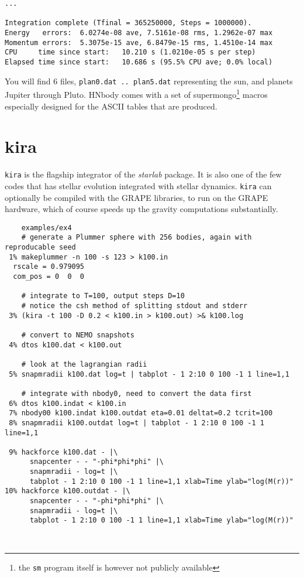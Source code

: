 {\begin{verbatim}
...
 
Integration complete (Tfinal = 365250000, Steps = 1000000).
Energy   errors:  6.0274e-08 ave, 7.5161e-08 rms, 1.2962e-07 max
Momentum errors:  5.3075e-15 ave, 6.8479e-15 rms, 1.4510e-14 max
CPU     time since start:   10.210 s (1.0210e-05 s per step)
Elapsed time since start:   10.686 s (95.5% CPU ave; 0.0% local)

\end{verbatim}\normalsize

You will find 6 files, {\tt plan0.dat .. plan5.dat} representing
the sun, and planets Jupiter through Pluto. HNbody comes with a
set of supermongo\footnote{the {\tt sm} program itself 
is however not publicly
available} macros especially  designed for the
ASCII tables that are produced.

\section{kira}

{\tt kira} is the flagship integrator of the {\it starlab} package. It is also
one of the few codes that has stellar evolution integrated with stellar
dynamics. {\tt kira} can optionally be compiled with the GRAPE libraries,
to run on the GRAPE hardware, which of course speeds up the gravity computations 
substantially.

\footnotesize\begin{verbatim}
    examples/ex4
    # generate a Plummer sphere with 256 bodies, again with reproducable seed
 1% makeplummer -n 100 -s 123 > k100.in
  rscale = 0.979095
  com_pos = 0  0  0

    # integrate to T=100, output steps D=10
    # notice the csh method of splitting stdout and stderr
 3% (kira -t 100 -D 0.2 < k100.in > k100.out) >& k100.log

    # convert to NEMO snapshots
 4% dtos k100.dat < k100.out

    # look at the lagrangian radii
 5% snapmradii k100.dat log=t | tabplot - 1 2:10 0 100 -1 1 line=1,1

    # integrate with nbody0, need to convert the data first
 6% dtos k100.indat < k100.in
 7% nbody00 k100.indat k100.outdat eta=0.01 deltat=0.2 tcrit=100
 8% snapmradii k100.outdat log=t | tabplot - 1 2:10 0 100 -1 1 line=1,1

 9% hackforce k100.dat - |\
      snapcenter - - "-phi*phi*phi" |\ 
      snapmradii - log=t |\
      tabplot - 1 2:10 0 100 -1 1 line=1,1 xlab=Time ylab="log(M(r))"
10% hackforce k100.outdat - |\
      snapcenter - - "-phi*phi*phi" |\
      snapmradii - log=t |\
      tabplot - 1 2:10 0 100 -1 1 line=1,1 xlab=Time ylab="log(M(r))"



\end{verbatim}}
